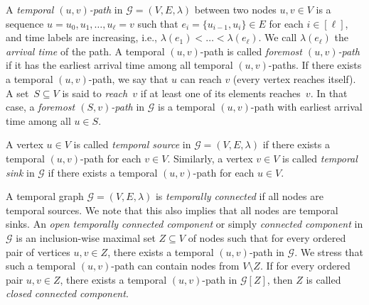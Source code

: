 \documentclass[a4paper,11pt]{article}
\theoremstyle{definition}
\theoremstyle{plain}
\newcommand{\GGG}{\mathcal{G}}
\begin{document}
A \emph{temporal $(u, v)$-path} in $\GGG=(V, E, \lambda)$ between two nodes $u,v\in V$ is a sequence $u=u_0,u_1,\ldots, u_\ell=v$ such that $e_i=\{u_{i-1}, u_i\}\in E$ for each $i\in [\ell]$,
and time labels are increasing, i.e., $\lambda(e_1)< \ldots < \lambda(e_\ell)$. We call $\lambda(e_\ell)$ the \emph{arrival time} of the path.
A temporal $(u,v)$-path is called \emph{foremost $(u, v)$-path} if it has the earliest arrival time among all temporal $(u,v)$-paths.
If there exists a temporal $(u,v)$-path, we say that $u$ can reach $v$ (every vertex reaches itself).
%
A set~$S \subseteq V$ is said to \emph{reach~$v$} if at least one of its elements reaches~$v$.
In that case, a \emph{foremost $(S, v)$-path} in $\GGG$ is a temporal $(u, v)$-path with earliest arrival time among all $u\in S$.

A vertex $u\in V$ is called \emph{temporal source} in $\GGG=(V, E, \lambda)$ if there exists a temporal $(u,v)$-path for each $v\in V$.
Similarly, a vertex $v\in V$ is called \emph{temporal sink} in $\GGG$ if there exists a temporal $(u,v)$-path for each $u\in V$.

A temporal graph $\GGG=(V, E, \lambda)$ is \emph{temporally connected} if all nodes are temporal sources. We note that this also implies that all nodes are temporal sinks.
An \emph{open temporally connected component} or simply \emph{connected component} in $\GGG$ is an inclusion-wise maximal set $Z\subseteq V$
of nodes such that for every ordered pair of vertices $u,v\in Z$, there exists a temporal $(u,v)$-path in $\GGG$. We stress that such a temporal $(u,v)$-path can contain nodes from $V\setminus Z$.
If for every ordered pair $u,v\in Z$, there exists a temporal $(u,v)$-path in $\GGG[Z]$, then $Z$ is called
\emph{closed connected component}.


\end{document}
